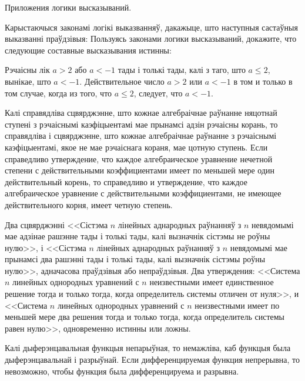 



{Приложения логики высказываний.}

\begin{problemList}

\problemItemSimple
{Карыстаючыся законамі логікі выказванняў, дакажыце, што наступныя састаўныя выказванні праўдзівыя:}
{Пользуясь законами логики высказываний, докажите, что следующие составные высказывания истинны:}

\begin{belarusianEnumerate}

\problemItemSimple
{Рэчаісны лік $a > 2$ або $a < -1$ тады і толькі тады, калі з таго, што $a \le 2$, вынікае, што $a < -1$.}
{Действительное число $a > 2$ или $a < -1$ в том и только в том случае, когда из того, что $a \le 2$, следует, что $a < -1$.}

\problemItemSimple
{Калі справядліва сцвярджэнне, што кожнае алгебраічнае раўнанне няцотнай ступені з рэчаіснымі каэфіцыентамі мае прынамсі адзін рэчаісны корань, то справядліва і сцвярджэнне, што кожнае алгебраічнае раўнанне з рэчаіснымі каэфіцыентамі, якое не мае рэчаіснага кораня, мае цотную ступень.}
{Если справедливо утверждение, что каждое алгебраическое уравнение нечетной степени с действительными коэффициентами имеет по меньшей мере один действительный корень, то справедливо и утверждение, что каждое алгебраическое уравнение с действительными коэффициентами, не имеющее действительного корня, имеет четную степень.}

\problemItemSimple
{Два сцвярджэнні <<Сістэма $n$ лінейных аднародных раўнанняў з $n$ невядомымі мае адзінае рашэнне тады і толькі тады, калі вызначнік сістэмы не роўны нулю>>, і <<Сістэма $n$ лінейных аднародных раўнанняў з $n$ невядомымі мае прынамсі два рашэнні тады і толькі тады, калі вызначнік сістэмы роўны нулю>>, адначасова праўдзівыя або непраўдзівыя.}
{Два утверждения: <<Система $n$ линейных однородных уравнений с $n$ неизвестными имеет единственное решение тогда и только тогда, когда определитель системы отличен от нуля>>, и <<Система $n$ линейных однородных уравнений с $n$ неизвестными имеет по меньшей мере два решения тогда и только тогда, когда определитель системы равен нулю>>, одновременно истинны или ложны.}

\problemItemSimple
{Калі дыферэнцавальная функцыя непарыўная, то немажліва, каб функцыя была дыферэнцавальнай і разрыўнай.}
{Если дифференцируемая функция непрерывна, то невозможно, чтобы функция была дифференцируема и разрывна.}


\end{belarusianEnumerate}
\end{problemList}

